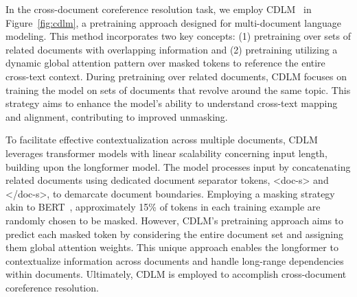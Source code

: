 In the cross-document coreference resolution task, we employ CDLM~\cite{caciularu-etal-2021-cdlm-cross} in Figure~\ref{fig:cdlm}, a pretraining approach designed for multi-document language modeling. This method incorporates two key concepts: (1) pretraining over sets of related documents with overlapping information and (2) pretraining utilizing a dynamic global attention pattern over masked tokens to reference the entire cross-text context. During pretraining over related documents, CDLM focuses on training the model on sets of documents that revolve around the same topic. This strategy aims to enhance the model's ability to understand cross-text mapping and alignment, contributing to improved unmasking.

To facilitate effective contextualization across multiple documents, CDLM leverages transformer models with linear scalability concerning input length, building upon the longformer model. The model processes input by concatenating related documents using dedicated document separator tokens, <doc-s> and </doc-s>, to demarcate document boundaries. Employing a masking strategy akin to BERT~\cite{devlin2019bert}, approximately 15\% of tokens in each training example are randomly chosen to be masked. However, CDLM's pretraining approach aims to predict each masked token by considering the entire document set and assigning them global attention weights. This unique approach enables the longformer to contextualize information across documents and handle long-range dependencies within documents. Ultimately, CDLM is employed to accomplish cross-document coreference resolution.

